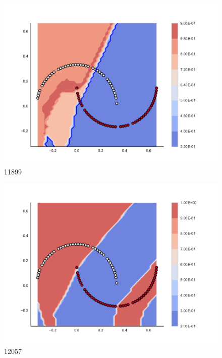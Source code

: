 \begin{subfigure}[b]{0.09\textwidth}
    \includegraphics[clip, trim=2.35cm 1.75cm 4.5cm 0cm,width=\textwidth]{img/convergence/11899.pdf}
    \caption{11899}
    \label{fig:convergence_11899}
\end{subfigure}
%
\begin{subfigure}[b]{0.09\textwidth}
    \includegraphics[clip, trim=2.35cm 1.75cm 4.5cm 0cm,width=\textwidth]{img/convergence/12057.pdf}
    \caption{12057}
    \label{fig:convergence_12057}
\end{subfigure}
%
